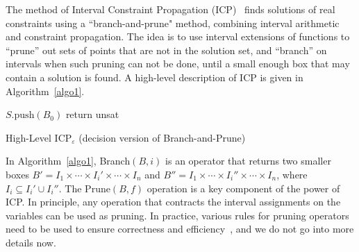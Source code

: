 \documentclass[envcountsect]{llncs}
\begin{document}
The method of Interval Constraint Propagation (ICP)~\cite{handbookICP} finds
solutions of real constraints using a ``branch-and-prune" method, combining
interval arithmetic and constraint propagation. The idea is to use interval
extensions of functions to ``prune'' out sets of points that are not in the
solution set, and ``branch'' on intervals when such pruning can not be done,
until a small enough box that may contain a solution is found. A high-level
description of ICP is given in Algorithm~\ref{algo1}.
\begin{algorithm}[h!]
\BlankLine
$S.\mathrm{push}(B_0)$\;
\While{$S\neq \emptyset$}{\label{while}
$B\leftarrow S.\mathrm{pop}()$ \;
\While{$\exists 1\leq i \leq m, B\neq \mathrm{Prune}(B,f_i)$}{
        $B\leftarrow\mathrm{Prune}(B, f_i)$ \;
}
\If{$B\neq \emptyset$}
{\eIf{$\exists 1\leq i\leq n, |I_i|\geq \varepsilon$}{$\{B_1,B_2\}\leftarrow
\mathrm{Branch}(B, i)$\;$S.\mathrm{push}(\{B_1,B_2\})$\;}{return {\sf sat}\;}}
}
return {\sf unsat}\;
\caption{High-Level ICP$_{\varepsilon}$ (decision version of
Branch-and-Prune)\label{algo1}}
\end{algorithm}

In Algorithm~\ref{algo1}, Branch$(B,i)$ is an operator that returns two smaller
boxes $B' = I_1\times\cdots\times I_i'\times\cdots\times I_n$ and $B''=I_1\times
\cdots\times I_i''\times \cdots\times I_n$, where $I_i\subseteq I_i'\cup
I_i''$. The $\mathrm{Prune}(B, f)$ operation is a key component of the power of
ICP. In principle, any operation that contracts the interval assignments on the
variables can be used as pruning. In practice, various rules for pruning
operators need to be used to ensure correctness and efficiency~\cite{}, and we
do not go into more details now.
\end{document}
